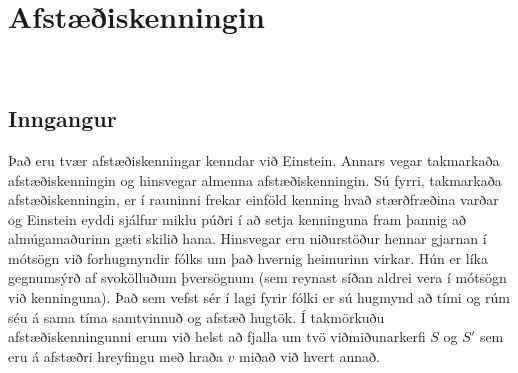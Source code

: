 \ifdefined \wholebook \else\documentclass[oneside]{book}\usepackage{EdlBook}\graphicspath{{figures/}}
\begin{document}
%
\setcounter{chapter}{21} %
%
\fi

\renewcommand{\thefigure}{\arabic{figure}}


\chapter{Afstæðiskenningin}


\begin{tcolorbox}

 \\

\vspace{-0.5cm}
\end{tcolorbox}

\section{Inngangur}

Það eru tvær afstæðiskenningar kenndar við Einstein. Annars vegar takmarkaða afstæðiskenningin og hinsvegar almenna afstæðiskenningin. Sú fyrri, takmarkaða afstæðiskenningin, er í rauninni frekar einföld kenning hvað stærðfræðina varðar og Einstein eyddi sjálfur miklu púðri í að setja kenninguna fram þannig að almúgamaðurinn gæti skilið hana. Hinsvegar eru niðurstöður hennar gjarnan í mótsögn við forhugmyndir fólks um það hvernig heimurinn virkar. Hún er líka gegnumsýrð af svokölluðum þversögnum (sem reynast síðan aldrei vera í mótsögn við kenninguna). Það sem vefst sér í lagi fyrir fólki er sú hugmynd að tími og rúm séu á sama tíma samtvinnuð og afstæð hugtök. Í takmörkuðu afstæðiskenningunni erum við helst að fjalla um tvö viðmiðunarkerfi $S$ og $S'$ sem eru á afstæðri hreyfingu með hraða $v$ miðað við hvert annað. \\

\setcounter{theorem}{1}
\end{document}

